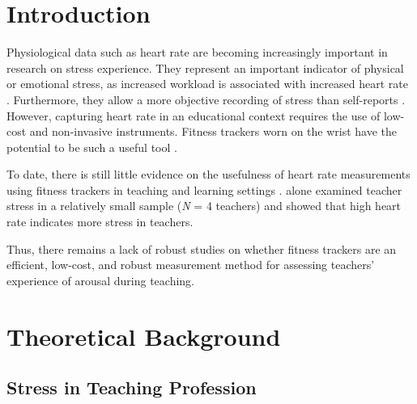 \documentclass[]{elsarticle} %
\newenvironment{Shaded}{\begin{snugshade}}{\end{snugshade}}
\newcommand{\AttributeTok}[1]{\textcolor[rgb]{0.77,0.63,0.00}{#1}}
\newcommand{\CommentTok}[1]{\textcolor[rgb]{0.56,0.35,0.01}{\textit{#1}}}
\newcommand{\DecValTok}[1]{\textcolor[rgb]{0.00,0.00,0.81}{#1}}
\newcommand{\FunctionTok}[1]{\textcolor[rgb]{0.00,0.00,0.00}{#1}}
\newcommand{\NormalTok}[1]{#1}
\newcommand{\SpecialCharTok}[1]{\textcolor[rgb]{0.00,0.00,0.00}{#1}}
\begin{document}
\begin{Shaded}
\end{Shaded}

\hypertarget{introduction}{%
\section{Introduction}\label{introduction}}

Physiological data such as heart rate are becoming increasingly
important in research on stress experience. They represent an important
indicator of physical or emotional stress, as increased workload is
associated with increased heart rate \citep{sachs2014physiologische}.
Furthermore, they allow a more objective recording of stress than
self-reports \citep{rungeusing}. However, capturing heart rate in an
educational context requires the use of low-cost and non-invasive
instruments. Fitness trackers worn on the wrist have the potential to be
such a useful tool \citep{ferguson2015validity}.

To date, there is still little evidence on the usefulness of heart rate
measurements using fitness trackers in teaching and learning settings
\citep{ertzberger2016use, lowe2016educational}. \citet{rungeusing} alone
examined teacher stress in a relatively small sample (\emph{N} = 4
teachers) and showed that high heart rate indicates more stress in
teachers.

Thus, there remains a lack of robust studies on whether fitness trackers
are an efficient, low-cost, and robust measurement method for assessing
teachers' experience of arousal during teaching.

\hypertarget{theoretical-background}{%
\section{Theoretical Background}\label{theoretical-background}}

\hypertarget{stress-in-teaching-profession}{%
\subsection{Stress in Teaching
Profession}\label{stress-in-teaching-profession}}
\end{document}
